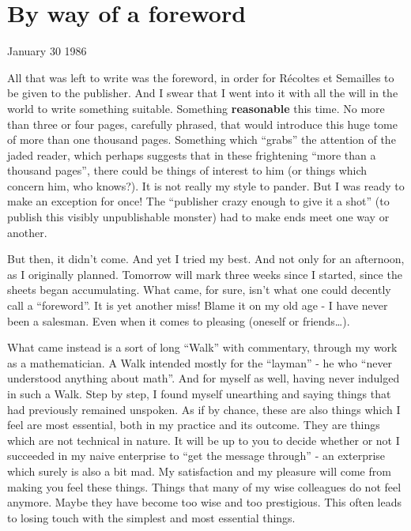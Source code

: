 \begin{comment}
\documentclass{book}
\usepackage{master}
\newcommand{\rec}{$\text{R\'ecoltes et Semailles}$}
\newcommand{\no}{n$^\circ$}
\hfuzz = 100pt

\end{comment}

\chapter{By way of a foreword}

January 30 1986

All that was left to write was the foreword, in order for
R\'ecoltes et Semailles to be given to the publisher.
And I swear that I went into it with all the will in the world to write something suitable. 
Something \textbf{reasonable} this time. No more than three or four pages, carefully phrased, that would introduce this huge tome of more than one thousand
pages. Something which ``grabs'' the attention of the jaded reader, 
which perhaps suggests that in these frightening ``more than a thousand pages'', there
could be things of interest to him (or things which concern him, who knows?). It is not
really my style to pander. But I was ready to make an exception for once!
The ``publisher crazy enough to give it a shot'' (to publish this visibly unpublishable
monster) had to make ends meet one way or another. 

But then, it didn't come. And yet I tried my best. And not only for an afternoon, as I
originally planned. Tomorrow will mark three weeks since I started, since the sheets began
accumulating.
What came, for sure, isn't what one could decently call a ``foreword''.
It is yet another miss! Blame it on my old age - I have never been a salesman. Even when
it comes to pleasing (oneself or friends\ldots).

What came instead is a sort of long ``Walk'' with commentary, through my work as a mathematician. 
A Walk intended mostly for the ``layman'' - he who ``never understood anything about
math''. And for myself as well, having never indulged in such a Walk. 
Step by step, I found myself unearthing and saying things that had previously remained
unspoken. As if by chance, these are also things which I feel are most essential, both in
my practice and its outcome. 
They are things which are not technical in nature. It will be up to you to decide whether
or not I succeeded in my naive enterprise to ``get the message through'' - an exterprise
which surely is also a bit mad. 
My satisfaction and my pleasure will come from making you feel these things. 
Things that many of my wise colleagues do not feel anymore. Maybe they have become too wise
and too prestigious.
This often leads to losing touch with the simplest and most essential things. 

